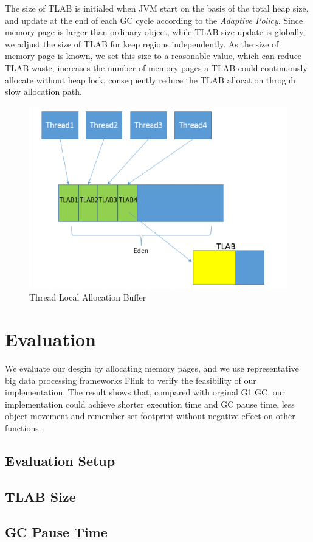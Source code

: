 \documentclass[sigplan, screen]{acmart}
\begin{document}
The size of TLAB is initialed when JVM start on the basis of the total heap size, and update at the end of each GC cycle according to the  \emph{Adaptive Policy}.
Since memory page is larger than ordinary object, while TLAB size update is globally, we adjust the size of TLAB for keep regions independently. As the size of
memory page is known, we set this size to a reasonable value, which can reduce TLAB waste, increases the number of memory pages a TLAB could continuously allocate 
without heap lock, consequently reduce the TLAB allocation throguh slow allocation path. 

\begin{figure}[h]
  \centering
  \includegraphics[width=\linewidth]{figures/TLAB}
  \caption{Thread Local Allocation Buffer}
\end{figure}

\section{Evaluation}
We evaluate our desgin by allocating memory pages, and we use representative big data processing frameworks Flink to verify the feasibility of our implementation.
The result shows that, compared with orginal G1 GC, our implementation could achieve shorter execution time and GC pause time, less object movement and remember set
footprint without negative effect on other functions.

\subsection{Evaluation Setup}

\subsection{TLAB Size}

\subsection{GC Pause Time}




\end{document}
